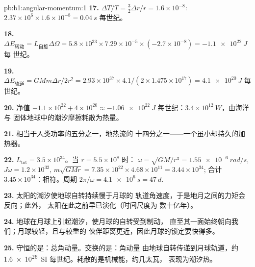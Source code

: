 \begin{solution}{pb:b1:angular-momentum:1}
\textbf{17.} $\Delta T/T = \tfrac32\Delta r/r = 1.6\times10^{-8}$: $2.37\times
10^6 \times 1.6\times10^{-8} = \qty{0.04}{s}$ 每世纪。

\textbf{18.} $\Delta E_{\text{转动}} = L_{\text{自旋}}\Delta\Omega = 5.8\times10^{33}
\times 7.29\times10^{-5} \times (-2.7\times10^{-8}) = \qty{-1.1e22}{J}$ 每
世纪。

\textbf{19.} $\Delta E_{\text{轨道}} = GMm\Delta r/2r^2 = 2.93\times10^{37}
\times 4.1/(2 \times 1.475\times10^{17}) = \qty{+4.1e20}{J}$ 每世纪。

\textbf{20.} 净值 $-1.1\times10^{22} + 4\times10^{20} \approx \qty{-1.06e22}{J}$
每世纪：$3.4\times10^{12}\ \unit{W}$，由海洋与
固体地球中的潮汐摩擦耗散为热量。

\textbf{21.} 相当于人类功率的五分之一，地热流的
十四分之一——一个虽小却持久的加热器。

\textbf{22.} $L_{\text{tot}} = 3.5\times10^{34}$。当 $r = 5.5\times10^8$ 时：
$\omega = \sqrt{GM/r^3} = \qty{1.55e-6}{rad/s}$, $J\omega = 1.2\times10^{32}$,
$m\sqrt{GMr} = 7.35\times10^{22} \times 4.68\times10^{11} = 3.44\times10^{34}$;
合计 $3.45\times10^{34}$：相符。周期 $2\pi/\omega = \qty{4.1e6}{s}
= \qty{47}{d}$.

\textbf{23.} 太阳的潮汐使地球自转持续慢于月球的
轨道角速度，于是地月之间的力矩会反向；此外，
太阳在此之前早已演化（时间尺度为
数十亿年）。

\textbf{24.} 地球在月球上引起潮汐，使月球的自转受到制动，
直至其一面始终朝向我们；月球较轻，且与较重的
伙伴距离更近，因此月球的锁定要快得多。

\textbf{25.} 守恒的是：总角动量。交换的是：角动量
由地球自转传递到月球轨道，约 \qty{1.6e26}{SI}
每世纪。耗散的是机械能，约几太瓦，
表现为潮汐热。
\end{solution}
